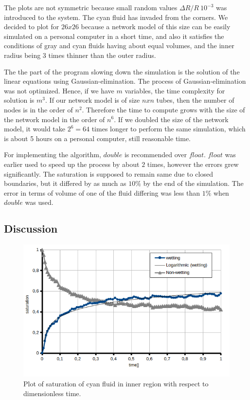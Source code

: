 \documentclass{crm-article}
\begin{document}
			
			The plots are not symmetric because small random values $\Delta R / R ~ 10^{-3}$ was introduced to the system. The cyan fluid has invaded from the corners. We decided to plot for $26 x 26$ because a network model of this size can be easily simulated on a personal computer in a short time, and also it satisfies the conditions of gray and cyan fluids having about equal volumes, and the inner radius being 3 times thinner than the outer radius.
			
			The the part of the program slowing down the simulation is the solution of the linear equations using Gaussian-elimination. The process of Gaussian-elimination was not optimized. Hence, if we have $m$ variables, the time complexity for solution is $m^3$. If our network model is of size $n x n$ tubes, then the number of nodes is in the order of $n^2$. Therefore the time to compute grows with the size of the network model in the order of $n^6$. If we doubled the size of the network model, it would take $2^6 = 64$ times longer to perform the same simulation, which is about 5 hours on a personal computer, still reasonable time.
			
			For implementing the algorithm, $double$ is recommended over $float$. $float$ was earlier used to speed up the process by about $2$ times, however the errors grew significantly. The saturation is supposed to remain same due to closed boundaries, but it differed by as much as $10\%$ by the end of the simulation. The error in terms of volume of one of the fluid differing was less than $1\%$ when $double$ was used.
			
		\subsection{Discussion} \label{sec:exp-discussion}
			\begin{figure}[H]
				\centering
				\includegraphics[width=1.0\textwidth]{fig_plot-sat-vs-time2}
				\caption{Plot of saturation of cyan fluid in inner region with respect to dimensionless time.}
			\end{figure}
			
\end{document}
